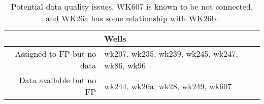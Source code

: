 \begin{table}[ht]
\centering
\begin{tabular}{rl}
  \hline
 & Wells \\ 
  \hline
Assigned to FP but no data & wk207, wk235, wk239, wk245, wk247, wk86, wk96 \\ 
  Data available but no FP & wk244, wk26a, wk28, wk249, wk607 \\ 
   \hline
\end{tabular}
\caption{Potential data quality issues. WK607 is known to be not connected, and WK26a has some relationship with WK26b.} 
\label{tab:quality}
\end{table}
